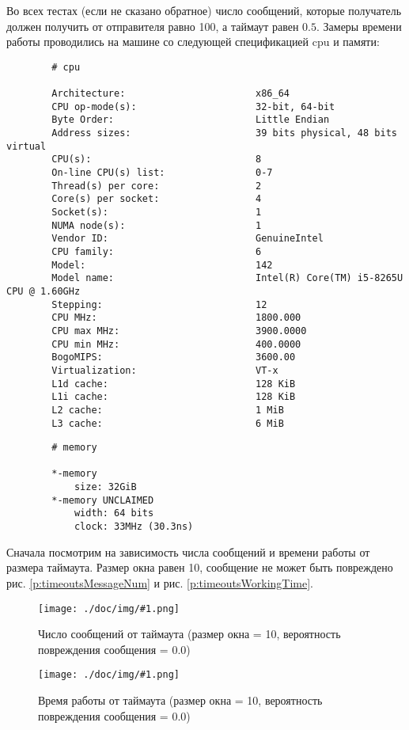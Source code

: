 \documentclass[a4paper,12pt]{article}
\newcommand{\plot}[3]{
    \label{#3}
    \begin{figure}[H]
        \begin{center}
            \texttt{[image: ./doc/img/\#1.png]}
            \caption{#2}
        \end{center}
    \end{figure}
}
\begin{document}
    Во всех тестах (если не сказано обратное) число сообщений, которые получатель должен получить от отправителя равно 100,
    а таймаут равен $ 0.5 $. Замеры времени работы проводились на машине со следующей спецификацией cpu и памяти:
    \begin{verbatim}
        # cpu

        Architecture:                       x86_64
        CPU op-mode(s):                     32-bit, 64-bit
        Byte Order:                         Little Endian
        Address sizes:                      39 bits physical, 48 bits virtual
        CPU(s):                             8
        On-line CPU(s) list:                0-7
        Thread(s) per core:                 2
        Core(s) per socket:                 4
        Socket(s):                          1
        NUMA node(s):                       1
        Vendor ID:                          GenuineIntel
        CPU family:                         6
        Model:                              142
        Model name:                         Intel(R) Core(TM) i5-8265U CPU @ 1.60GHz
        Stepping:                           12
        CPU MHz:                            1800.000
        CPU max MHz:                        3900.0000
        CPU min MHz:                        400.0000
        BogoMIPS:                           3600.00
        Virtualization:                     VT-x
        L1d cache:                          128 KiB
        L1i cache:                          128 KiB
        L2 cache:                           1 MiB
        L3 cache:                           6 MiB
    \end{verbatim}

    \begin{verbatim}
        # memory

        *-memory                  
            size: 32GiB
        *-memory UNCLAIMED
            width: 64 bits
            clock: 33MHz (30.3ns)
    \end{verbatim}
        

    Сначала посмотрим на зависимость числа сообщений и времени работы от размера таймаута.
    Размер окна равен 10, сообщение не может быть повреждено рис. \ref{p:timeoutsMessageNum} и рис. \ref{p:timeoutsWorkingTime}.

    \plot{timeoutsMessageNum}{Число сообщений от таймаута (размер окна = 10, вероятность повреждения сообщения = 0.0)}{p:timeoutsMessageNum}
    \plot{timeoutsWorkingTime}{Время работы от таймаута (размер окна = 10, вероятность повреждения сообщения = 0.0)}{p:timeoutsWorkingTime}
\end{document}
